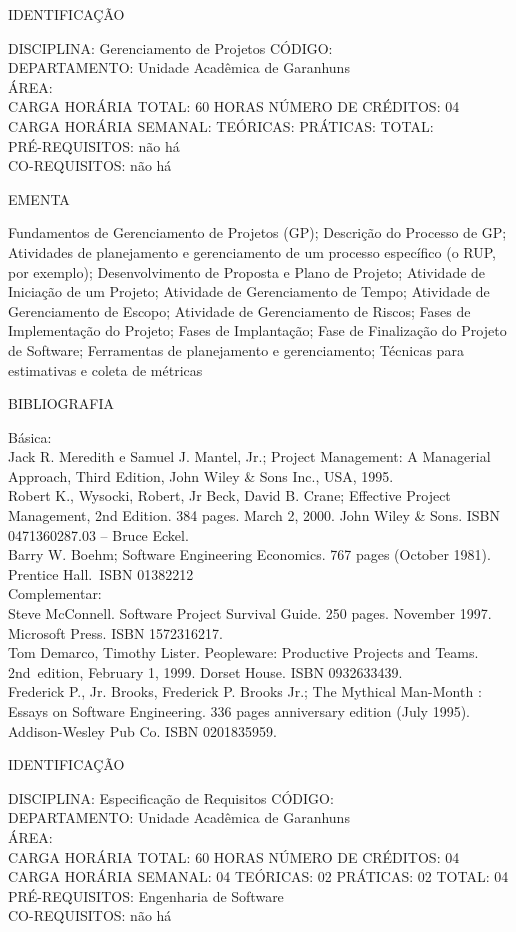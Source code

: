 \documentclass[
	12pt,				%
	openright,			%
  oneside,     %
	a4paper,			%
	chapter=TITLE,		%
	english,			%
	french,				%
	spanish,			%
	brazil				%
	]{abntex2}
\begin{document}
\begin{apendicesenv}
\newpage IDENTIFICAÇÃO

DISCIPLINA: Gerenciamento de Projetos CÓDIGO:\\ 
DEPARTAMENTO: Unidade Acadêmica de Garanhuns\\
ÁREA: \\
CARGA HORÁRIA TOTAL: 60 HORAS NÚMERO DE CRÉDITOS: 04\\
CARGA HORÁRIA SEMANAL: TEÓRICAS: PRÁTICAS: TOTAL: \\
PRÉ-REQUISITOS: não há\\
CO-REQUISITOS: não há

EMENTA 

Fundamentos de Gerenciamento de Projetos (GP); Descrição do Processo de GP; Atividades de planejamento e gerenciamento de um processo específico (o RUP, por exemplo); Desenvolvimento de Proposta e Plano de Projeto; Atividade de Iniciação de um Projeto; Atividade de Gerenciamento de Tempo; Atividade de Gerenciamento de Escopo; Atividade de Gerenciamento de Riscos; Fases de Implementação do Projeto; Fases de Implantação; Fase de Finalização do Projeto de Software; Ferramentas de planejamento e gerenciamento; Técnicas para estimativas e coleta de métricas

BIBLIOGRAFIA 

Básica:\\
Jack R. Meredith e Samuel J. Mantel, Jr.; Project Management: A
Managerial Approach, Third Edition, John Wiley \& Sons Inc., USA,
1995.\\
Robert K., Wysocki, Robert, Jr Beck, David B. Crane; Effective Project
Management, 2nd Edition. 384 pages. March 2, 2000. John Wiley \& Sons.
ISBN 0471360287.03 -- Bruce Eckel.\\
Barry W. Boehm; Software Engineering Economics. 767 pages (October
1981). Prentice Hall.~ISBN 01382212\\
Complementar:\\
Steve McConnell. Software Project Survival Guide. 250 pages. November
1997. Microsoft Press. ISBN 1572316217.\\
Tom Demarco, Timothy Lister. Peopleware: Productive Projects and Teams.
2nd~edition, February 1, 1999. Dorset House. ISBN 0932633439.\\
Frederick P., Jr. Brooks, Frederick P. Brooks Jr.; The Mythical
Man-Month : Essays on Software Engineering. 336 pages anniversary
edition (July 1995). Addison-Wesley Pub Co. ISBN 0201835959.\

\newpage IDENTIFICAÇÃO

DISCIPLINA: Especificação de Requisitos CÓDIGO:\\ 
DEPARTAMENTO: Unidade Acadêmica de Garanhuns\\ 
ÁREA: \\
CARGA HORÁRIA TOTAL: 60 HORAS NÚMERO DE CRÉDITOS: 04\\
CARGA HORÁRIA SEMANAL: 04 TEÓRICAS: 02 PRÁTICAS: 02 TOTAL: 04\\
PRÉ-REQUISITOS: Engenharia de Software\\
CO-REQUISITOS: não há


\end{apendicesenv}
\end{document}

